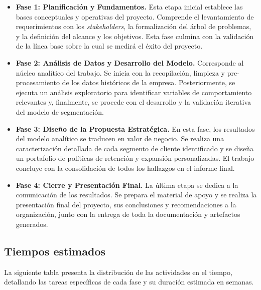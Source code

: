 \begin{itemize}
    \item \textbf{Fase 1: Planificación y Fundamentos.} Esta etapa inicial establece las bases conceptuales y operativas del proyecto. Comprende el levantamiento de requerimientos con los \textit{stakeholders}, la formalización del árbol de problemas, y la definición del alcance y los objetivos. Esta fase culmina con la validación de la línea base sobre la cual se medirá el éxito del proyecto.

    \item \textbf{Fase 2: Análisis de Datos y Desarrollo del Modelo.} Corresponde al núcleo analítico del trabajo. Se inicia con la recopilación, limpieza y pre-procesamiento de los datos históricos de la empresa. Posteriormente, se ejecuta un análisis exploratorio para identificar variables de comportamiento relevantes y, finalmente, se procede con el desarrollo y la validación iterativa del modelo de segmentación.

    \item \textbf{Fase 3: Diseño de la Propuesta Estratégica.} En esta fase, los resultados del modelo analítico se traducen en valor de negocio. Se realiza una caracterización detallada de cada segmento de cliente identificado y se diseña un portafolio de políticas de retención y expansión personalizadas. El trabajo concluye con la consolidación de todos los hallazgos en el informe final.

    \item \textbf{Fase 4: Cierre y Presentación Final.} La última etapa se dedica a la comunicación de los resultados. Se prepara el material de apoyo y se realiza la presentación final del proyecto, sus conclusiones y recomendaciones a la organización, junto con la entrega de toda la documentación y artefactos generados.
\end{itemize}

\subsection{Tiempos estimados}
La siguiente tabla presenta la distribución de las actividades en el tiempo, detallando las tareas específicas de cada fase y su duración estimada en semanas.


